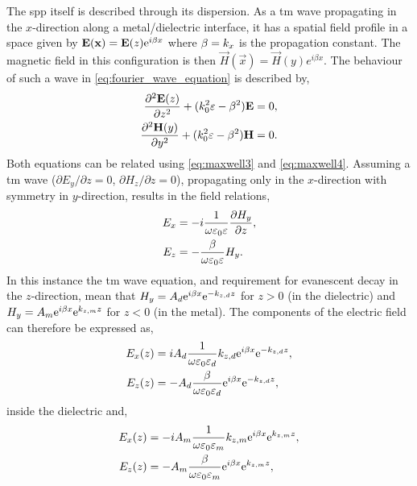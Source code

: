 \documentclass{article}
\begin{document}
The \gls{spp} itself is described through its dispersion. As a \gls{tm} wave propagating in the $x$-direction along a metal/dielectric interface, it has a spatial field profile in a space  given by $\mathbf{E}(\mathbf{x}) = \mathbf{E}(z)\mathrm{e}^{i\beta x}$ where $\beta=k_x$ is the propagation constant. The magnetic field in this configuration is then $\vec{H}(\vec{x}) = \vec{H}(y)e^{i\beta x}$. The behaviour of such a wave in \eqref{eq:fourier_wave_equation} is described by,
\begin{subequations}
\begin{align}
	\frac{\partial^2\mathbf{E}(z)}{\partial z^2} + (k_0^2\varepsilon - \beta^2)\mathbf{E} &= 0,\\
	\frac{\partial^2\mathbf{H}(y)}{\partial y^2} + (k_0^2\varepsilon - \beta^2)\mathbf{H} &= 0.
\end{align}
\end{subequations}
Both equations can be related using \eqref{eq:maxwell3} and \eqref{eq:maxwell4}. Assuming a \gls{tm} wave ($\partial E_y/\partial z = 0$, $\partial H_z/\partial z = 0$), propagating only in the $x$-direction with symmetry in $y$-direction, results in the field relations,
\begin{subequations}
\begin{align}
	E_x &= -i\frac{1}{\omega\varepsilon_0\varepsilon}\frac{\partial H_y}{\partial z},\\
	E_z &= -\frac{\beta}{\omega\varepsilon_0\varepsilon}H_y.
\end{align}
\end{subequations}
In this instance the \gls{tm} wave equation, and requirement for evanescent decay in the $z$-direction, mean that $H_y = A_d\mathrm{e}^{i\beta x}\mathrm{e}^{-k_{z,d} z}$ for $z>0$ (in the dielectric) and $H_y = A_m\mathrm{e}^{i\beta x}\mathrm{e}^{k_{z,m} z}$ for $z<0$ (in the metal). The components of the electric field can therefore be expressed as,
\begin{subequations}
\begin{align}
	E_x(z) &= iA_d\frac{1}{\omega\varepsilon_0\varepsilon_d}k_{z,d}\mathrm{e}^{i\beta x}\mathrm{e}^{-k_{z,d} z},\\
	E_z(z) &= -A_d\frac{\beta}{\omega\varepsilon_0\varepsilon_d}\mathrm{e}^{i\beta x}\mathrm{e}^{-k_{z,d} z},
\end{align}
\end{subequations}
inside the dielectric and,
\begin{subequations}
\begin{align}
	E_x(z) &= -iA_m\frac{1}{\omega\varepsilon_0\varepsilon_m}k_{z,m}\mathrm{e}^{i\beta x}\mathrm{e}^{k_{z,m} z},\\
	E_z(z) &= -A_m\frac{\beta}{\omega\varepsilon_0\varepsilon_m}\mathrm{e}^{i\beta x}\mathrm{e}^{k_{z,m} z},
\end{align}
\end{subequations}
\end{document}
